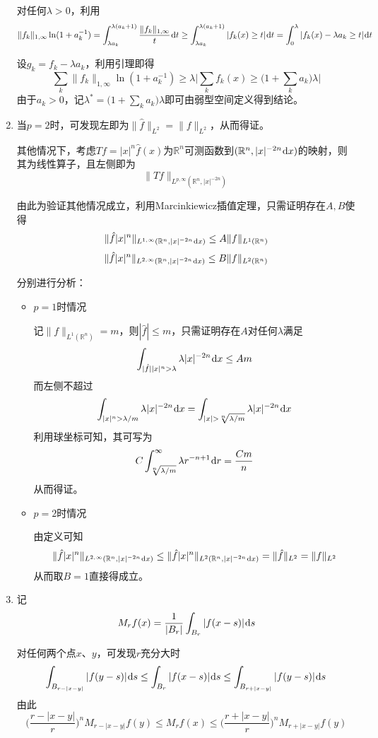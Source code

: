 \documentclass[a4paper,UTF8,fontset=windows]{ctexart}
\newcommand*{\dr}{\hspace{0.07em}\mathrm{d}}
\begin{document}
\begin{enumerate}
    对任何$\lambda>0$，利用
    $$\|f_k\|_{1,\infty}\ln(1+a_k^{-1})=\int_{\lambda a_k}^{\lambda(a_k+1)}\frac{\|f_k\|_{1,\infty}}{t}\dr t\ge\int_{\lambda a_k}^{\lambda(a_k+1)}|f_k(x)\ge t|\dr t=\int_0^\lambda|f_k(x)-\lambda a_k\ge t|\dr t$$

    设$g_k=f_k-\lambda a_k$，利用引理即得
    $$\sum_k\|f_k\|_{1,\infty}\ln(1+a_k^{-1})\ge\lambda\bigg|\sum_kf_k(x)\ge\bigg(1+\sum_ka_k\bigg)\lambda\bigg|$$
    由于$a_k>0$，记$\lambda^*=\big(1+\sum_ka_k\big)\lambda$即可由弱型空间定义得到结论。

    \item 当$p=2$时，可发现左即为$\|\hat{f}\|_{L^2}=\|f\|_{L^2}$，从而得证。
    
    其他情况下，考虑$Tf=|x|^n\hat{f}(x)$为$\mathbb{R}^n$可测函数到$(\mathbb{R}^n,|x|^{-2n}\dr x)$的映射，则其为线性算子，且左侧即为
    $$\|Tf\|_{L^{p,\infty}(\mathbb{R}^n,|x|^{-2n})}$$
    
    由此为验证其他情况成立，利用Marcinkiewicz插值定理，只需证明存在$A,B$使得
    $$\|\hat{f}|x|^n\|_{L^{1,\infty}(\mathbb{R}^n,|x|^{-2n}\dr x)}\le A\|f\|_{L^1(\mathbb{R}^n)}$$
    $$\|\hat{f}|x|^n\|_{L^{2,\infty}(\mathbb{R}^n,|x|^{-2n}\dr x)}\le B\|f\|_{L^2(\mathbb{R}^n)}$$

    分别进行分析：
    \begin{itemize}
        \item $p=1$时情况
        
        记$\|f\|_{L^1(\mathbb{R}^n)}=m$，则$|\hat{f}|\le m$，只需证明存在$A$对任何$\lambda$满足
        $$\int_{|\hat{f}||x|^n>\lambda}\lambda|x|^{-2n}\dr x\le Am$$
        而左侧不超过
        $$\int_{|x|^n>\lambda/m}\lambda|x|^{-2n}\dr x=\int_{|x|>\sqrt[n]{\lambda/m}}\lambda|x|^{-2n}\dr x$$
        利用球坐标可知，其可写为
        $$C\int_{\sqrt[n]{\lambda/m}}^\infty\lambda r^{-n+1}\dr r=\frac{Cm}{n}$$
        从而得证。

        \item $p=2$时情况

        由定义可知
        $$\|\hat{f}|x|^n\|_{L^{2,\infty}(\mathbb{R}^n,|x|^{-2n}\dr x)}\le\|\hat{f}|x|^n\|_{L^2(\mathbb{R}^n,|x|^{-2n}\dr x)}=\|\hat{f}\|_{L^2}=\|f\|_{L^2}$$
        从而取$B=1$直接得成立。

    \end{itemize}

    \item 
    记
    $$M_rf(x)=\frac{1}{|B_r|}\int_{B_r}|f(x-s)|\dr s$$
    
    对任何两个点$x$、$y$，可发现$r$充分大时
    $$\int_{B_{r-|x-y|}}|f(y-s)|\dr s\le\int_{B_r}|f(x-s)|\dr s\le\int_{B_{r+|x-y|}}|f(y-s)|\dr s$$
    由此
    $$\bigg(\frac{r-|x-y|}{r}\bigg)^nM_{r-|x-y|}f(y)\le M_rf(x)\le\bigg(\frac{r+|x-y|}{r}\bigg)^nM_{r+|x-y|}f(y)$$


\end{enumerate}
\end{document}
